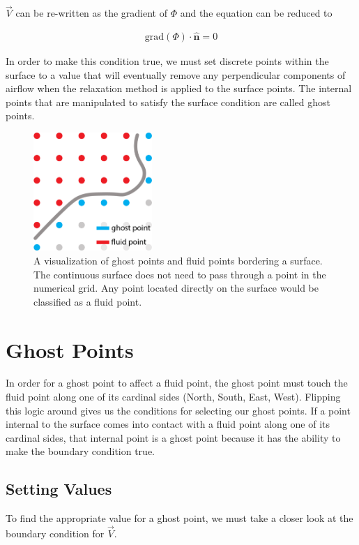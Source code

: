 \documentclass[11pt]{article}
\begin{document}
$\vec{V}$ can be re-written as the gradient of $\Phi$ and the equation can be reduced to

\begin{align}
    \text{grad}(\Phi) \cdot \hat{\textbf{n}} = 0
\end{align}

In order to make this condition true, we must set discrete points within the surface to a value that will eventually remove any perpendicular components of airflow when the relaxation method is applied to the surface points. The internal points that are manipulated to satisfy the surface condition are called ghost points.

\begin{figure} [H] %
	\centering
	\includegraphics[width=0.4\textwidth]{lin_ghost.png}
	\caption{A visualization of ghost points and fluid points bordering a surface. The continuous surface does not need to pass through a point in the numerical grid. Any point located directly on the surface would be classified as a fluid point.}
\end{figure}

\section{Ghost Points}
In order for a ghost point to affect a fluid point, the ghost point must touch the fluid point along one of its cardinal sides (North, South, East, West). Flipping this logic around gives us the conditions for selecting our ghost points. If a point internal to the surface comes into contact with a fluid point along one of its cardinal sides, that internal point is a ghost point because it has the ability to make the boundary condition true.

\subsection{Setting Values}
To find the appropriate value for a ghost point, we must take a closer look at the boundary condition for $\vec{V}$.
\end{document}
